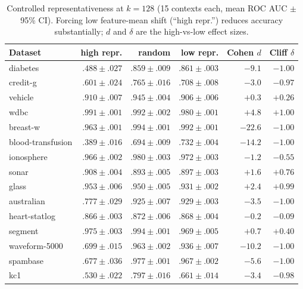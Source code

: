 \documentclass{article}
\begin{document}
\begin{table}[h]
\centering
\caption{Controlled representativeness at $k=128$ (15 contexts each, mean ROC AUC $\pm$ 95\% CI). Forcing low feature-mean shift (``high repr.'') reduces accuracy substantially; $d$ and $\delta$ are the high-vs-low effect sizes.}
\label{tab:controlled}
\begin{tabular}{lrrrrr}
\toprule
Dataset & high repr. & random & low repr. & Cohen $d$ & Cliff $\delta$ \\
\midrule
diabetes           & $.488{\pm}.027$ & $.859{\pm}.009$ & $.861{\pm}.003$ & $-9.1$ & $-1.00$ \\
credit-g           & $.601{\pm}.024$ & $.765{\pm}.016$ & $.708{\pm}.008$ & $-3.0$ & $-0.97$ \\
vehicle            & $.910{\pm}.007$ & $.945{\pm}.004$ & $.906{\pm}.006$ & $+0.3$ & $+0.26$ \\
wdbc               & $.991{\pm}.001$ & $.992{\pm}.002$ & $.980{\pm}.001$ & $+4.8$ & $+1.00$ \\
breast-w           & $.963{\pm}.001$ & $.994{\pm}.001$ & $.992{\pm}.001$ & $-22.6$ & $-1.00$ \\
blood-transfusion  & $.389{\pm}.016$ & $.694{\pm}.009$ & $.732{\pm}.004$ & $-14.2$ & $-1.00$ \\
ionosphere         & $.966{\pm}.002$ & $.980{\pm}.003$ & $.972{\pm}.003$ & $-1.2$ & $-0.55$ \\
sonar              & $.908{\pm}.004$ & $.893{\pm}.005$ & $.897{\pm}.003$ & $+1.6$ & $+0.76$ \\
glass              & $.953{\pm}.006$ & $.950{\pm}.005$ & $.931{\pm}.002$ & $+2.4$ & $+0.99$ \\
australian         & $.777{\pm}.029$ & $.925{\pm}.007$ & $.929{\pm}.003$ & $-3.5$ & $-1.00$ \\
heart-statlog      & $.866{\pm}.003$ & $.872{\pm}.006$ & $.868{\pm}.004$ & $-0.2$ & $-0.09$ \\
segment            & $.975{\pm}.003$ & $.994{\pm}.001$ & $.969{\pm}.005$ & $+0.7$ & $+0.40$ \\
waveform-5000      & $.699{\pm}.015$ & $.963{\pm}.002$ & $.936{\pm}.007$ & $-10.2$ & $-1.00$ \\
spambase           & $.677{\pm}.036$ & $.977{\pm}.001$ & $.967{\pm}.002$ & $-5.6$ & $-1.00$ \\
kc1                & $.530{\pm}.022$ & $.797{\pm}.016$ & $.661{\pm}.014$ & $-3.4$ & $-0.98$ \\
\bottomrule
\end{tabular}
\end{table}
\end{document}
